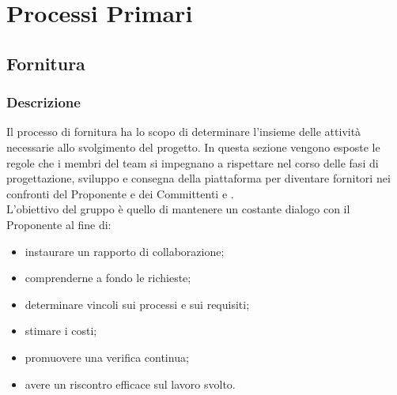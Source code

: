 \section{Processi Primari}
    \subsection{Fornitura}
        \subsubsection{Descrizione}
        Il processo di fornitura ha lo scopo di determinare l'insieme delle attività necessarie allo svolgimento del progetto. %
         In questa sezione vengono esposte le regole che i membri del team \Gruppo{} si impegnano a rispettare nel corso delle fasi di progettazione, sviluppo e consegna della piattaforma \NomeProgetto{} per diventare fornitori nei confronti del Proponente \Proponente{} e dei Committenti \TV{} e \RC{}. \\
         L'obiettivo del gruppo è quello di mantenere un costante dialogo con il Proponente al fine di:
         \begin{itemize}
		\item{instaurare un rapporto di collaborazione;} 
		\item{comprenderne a fondo le richieste;}
		\item{determinare vincoli sui processi e sui requisiti;}
		\item{stimare i costi;}
		\item{promuovere una verifica continua;}
		\item{avere un riscontro efficace sul lavoro svolto.}
         \end{itemize}
        
